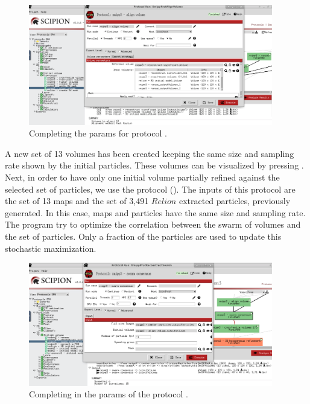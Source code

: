 \begin{figure}[H]
  \centering
  \captionsetup{width=.8\linewidth} 
  \includegraphics[width=0.95\textwidth]
  {images/8f_xmipp3_AlignVol.pdf}
  \caption{Completing the params for protocol .}
  \label{fig:align_volume}
  \end{figure}
  
A new set of 13 volumes has been created keeping the same size and sampling rate shown by the initial particles. These volumes can be visualized by pressing .\\

Next, in order to have only one initial volume partially refined against the selected set of particles, we use the protocol  (). The inputs of this protocol are the set of 13 maps and the set of 3,491 $Relion$ extracted particles, previously generated. In this case, maps and particles have the same size and sampling rate. The program try to optimize the correlation between the swarm of volumes and the set of particles. Only a fraction of the particles are used to update this stochastic maximization.

\begin{figure}[H]
  \centering
  \captionsetup{width=.8\linewidth} 
  \includegraphics[width=0.95\textwidth]
  {images/8g_xmipp3_swarnconsensus.pdf}
  \caption{Completing in the params of the protocol .}
  \label{fig:swarn_consensus}
  \end{figure}
  
